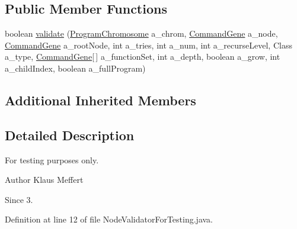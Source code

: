 \subsection*{Public Member Functions}
\begin{DoxyCompactItemize}
\item 
boolean \hyperlink{classorg_1_1jgap_1_1gp_1_1impl_1_1_node_validator_for_testing_a6c2725d2592460b338e13e3f6feb52f3}{validate} (\hyperlink{classorg_1_1jgap_1_1gp_1_1impl_1_1_program_chromosome}{Program\-Chromosome} a\-\_\-chrom, \hyperlink{classorg_1_1jgap_1_1gp_1_1_command_gene}{Command\-Gene} a\-\_\-node, \hyperlink{classorg_1_1jgap_1_1gp_1_1_command_gene}{Command\-Gene} a\-\_\-root\-Node, int a\-\_\-tries, int a\-\_\-num, int a\-\_\-recurse\-Level, Class a\-\_\-type, \hyperlink{classorg_1_1jgap_1_1gp_1_1_command_gene}{Command\-Gene}\mbox{[}$\,$\mbox{]} a\-\_\-function\-Set, int a\-\_\-depth, boolean a\-\_\-grow, int a\-\_\-child\-Index, boolean a\-\_\-full\-Program)
\end{DoxyCompactItemize}
\subsection*{Additional Inherited Members}


\subsection{Detailed Description}
For testing purposes only.

\begin{DoxyAuthor}{Author}
Klaus Meffert 
\end{DoxyAuthor}
\begin{DoxySince}{Since}
3. 
\end{DoxySince}


Definition at line 12 of file Node\-Validator\-For\-Testing.\-java.



